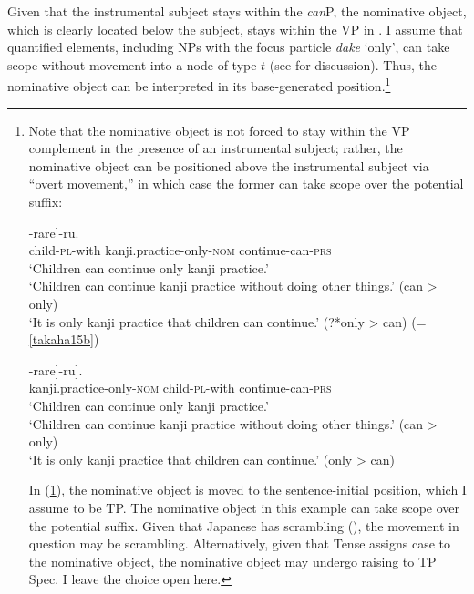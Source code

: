 \documentclass[output=paper]{langscibook}
\begin{document}
Given that the instrumental subject stays within the \emph{can}P, the nominative object, which is clearly located below the subject, stays within the VP in . I assume that quantified elements, including NPs with the focus particle \emph{dake} ‘only’, can take scope without movement into a node of type $t$ (see \citealt{Blok2017} for discussion). Thus, the nominative object can be interpreted in its base-generated position.\footnote{Note that the nominative object is not forced to stay within the VP complement in the presence of an instrumental subject; rather, the nominative object can be positioned above the instrumental subject via “overt movement,” in which case the former can take scope over the potential suffix: 

\begin{exe}
\ex 
\begin{xlist}
\ex \label{takahaiaa}
\gll [$_{\textnormal{canP}}$ {Kodomo-tati-de} [$_{\textnormal{VP}}$ {kanzirensyuu-dake-ga} {tuzuke}]-{rare}]-{ru}.\\
{} child-\textsc{pl}-with {} kanji.practice-only-\textsc{nom} continue-can-\textsc{prs}\\
\glt ‘Children can continue only kanji practice.’\\
‘Children can continue kanji practice without doing other things.’ (can \textgreater{} only)\\
‘It is only kanji practice that children can continue.’ (?*only \textgreater{} can) (=\,\ref{takaha15b})

\ex \label{takahaibb}
\gll [$_{\textnormal{TP}}$ {Kanzirensyuu-dake$_{\textnormal{i}}$-ga} [$_{\textnormal{canP}}$ {kodomo-tati-de} [$_{\textnormal{VP}}$ {\textit{t}$_{\textnormal{i}}$} {tuzuke}]-{rare}]-{ru}].\\
{} kanji.practice-only-\textsc{nom} {} child-\textsc{pl}-with {} {} continue-can-\textsc{prs}\\
\glt ‘Children can continue only kanji practice.’\\
‘Children can continue kanji practice without doing other things.’ (can \textgreater{} only)\\
‘It is only kanji practice that children can continue.’ (only \textgreater{} can)
\end{xlist}
\end{exe}
In (\ref{takahaibb}), the nominative object is moved to the sentence-initial position, which I assume to be TP. The nominative object in this example can take scope over the potential suffix. Given that Japanese has scrambling (\citealt{Saito1985}), the movement in question may be scrambling. Alternatively, given that Tense assigns case to the nominative object, the nominative object may undergo raising to TP Spec. I leave the choice open here.}
\end{document}
